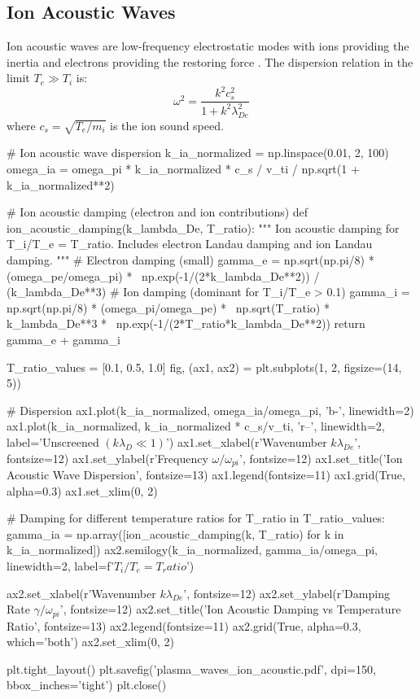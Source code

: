 \documentclass[11pt,a4paper]{article}
\begin{document}
\subsection{Ion Acoustic Waves}

Ion acoustic waves are low-frequency electrostatic modes with ions providing the inertia and electrons providing the restoring force \cite{Chen2016}. The dispersion relation in the limit $T_e \gg T_i$ is:
\begin{equation}
\omega^2 = \frac{k^2 c_s^2}{1 + k^2 \lambda_{De}^2}
\end{equation}
where $c_s = \sqrt{T_e/m_i}$ is the ion sound speed.

\begin{pycode}
# Ion acoustic wave dispersion
k_ia_normalized = np.linspace(0.01, 2, 100)
omega_ia = omega_pi * k_ia_normalized * c_s / v_ti / np.sqrt(1 + k_ia_normalized**2)

# Ion acoustic damping (electron and ion contributions)
def ion_acoustic_damping(k_lambda_De, T_ratio):
    """
    Ion acoustic damping for T_i/T_e = T_ratio.
    Includes electron Landau damping and ion Landau damping.
    """
    # Electron damping (small)
    gamma_e = np.sqrt(np.pi/8) * (omega_pe/omega_pi) * \
              np.exp(-1/(2*k_lambda_De**2)) / (k_lambda_De**3)
    # Ion damping (dominant for T_i/T_e > 0.1)
    gamma_i = np.sqrt(np.pi/8) * (omega_pi/omega_pe) * \
              np.sqrt(T_ratio) * k_lambda_De**3 * \
              np.exp(-1/(2*T_ratio*k_lambda_De**2))
    return gamma_e + gamma_i

T_ratio_values = [0.1, 0.5, 1.0]
fig, (ax1, ax2) = plt.subplots(1, 2, figsize=(14, 5))

# Dispersion
ax1.plot(k_ia_normalized, omega_ia/omega_pi, 'b-', linewidth=2)
ax1.plot(k_ia_normalized, k_ia_normalized * c_s/v_ti, 'r--',
         linewidth=2, label='Unscreened $(k\lambda_D \ll 1)$')
ax1.set_xlabel(r'Wavenumber $k\lambda_{De}$', fontsize=12)
ax1.set_ylabel(r'Frequency $\omega/\omega_{pi}$', fontsize=12)
ax1.set_title('Ion Acoustic Wave Dispersion', fontsize=13)
ax1.legend(fontsize=11)
ax1.grid(True, alpha=0.3)
ax1.set_xlim(0, 2)

# Damping for different temperature ratios
for T_ratio in T_ratio_values:
    gamma_ia = np.array([ion_acoustic_damping(k, T_ratio)
                         for k in k_ia_normalized])
    ax2.semilogy(k_ia_normalized, gamma_ia/omega_pi, linewidth=2,
                 label=f'$T_i/T_e = {T_ratio}$')

ax2.set_xlabel(r'Wavenumber $k\lambda_{De}$', fontsize=12)
ax2.set_ylabel(r'Damping Rate $\gamma/\omega_{pi}$', fontsize=12)
ax2.set_title('Ion Acoustic Damping vs Temperature Ratio', fontsize=13)
ax2.legend(fontsize=11)
ax2.grid(True, alpha=0.3, which='both')
ax2.set_xlim(0, 2)

plt.tight_layout()
plt.savefig('plasma_waves_ion_acoustic.pdf', dpi=150, bbox_inches='tight')
plt.close()
\end{pycode}
\end{document}
